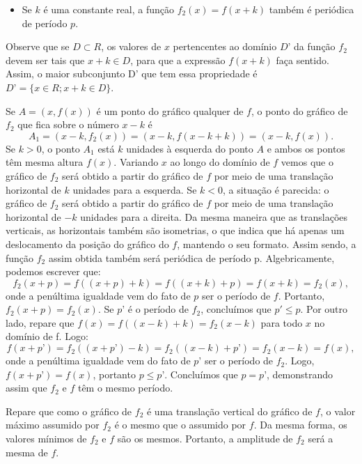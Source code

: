 \begin{itemize}
\item 	Se $k$ é uma constante real, a função $f_2(x) = f(x + k)$ também é periódica de período $p$.
\end{itemize}
Observe que se $D\subset R$, os valores de $x$ pertencentes ao domínio $D’$ da função $f_2$ devem ser tais que $x + k \in D$, para que a expressão $f(x+k)$ faça sentido. Assim, o maior subconjunto D’ que tem essa propriedade é $D’ = \{x \in R;x+k\in D\}$.

Se $A = (x,f(x))$ é um ponto do gráfico qualquer de $f$, o ponto do gráfico de $f_2$ que fica sobre o número $x - k$  é 
\begin{equation*}
A_1 = (x - k , f_2(x)) = (x - k, f(x - k + k)) = (x - k, f(x)).
\end{equation*}
Se $k > 0$, o ponto $A_1$ está $k$ unidades à esquerda do ponto $A$ e ambos os pontos têm mesma altura $f(x)$. Variando $x$ ao longo do domínio de $f$ vemos que o gráfico de $f_2$ será obtido a partir do gráfico de $f$ por meio de uma translação horizontal de $k$ unidades para a esquerda. Se $k < 0$, a situação é parecida: o gráfico de $f_2$ será obtido a partir do gráfico de $f$ por meio de uma translação horizontal de $-k$ unidades para a direita. Da mesma maneira que as translações verticais, as horizontais também são isometrias, o que indica que há apenas um deslocamento da posição do gráfico do $f$, mantendo o seu formato. Assim sendo, a função $f_2$ assim obtida também será periódica de período p. Algebricamente, podemos escrever que:
\begin{equation*}
f_2(x+p) = f((x+p) + k) = f((x+k)+p) = f(x+k) = f_2(x),
\end{equation*}
onde a penúltima igualdade vem do fato de $p$ ser o período de $f$. Portanto, $f_2(x+p) = f_2(x)$. Se $p’$ é o período de $f_2$, concluímos que $p'\leq p$. Por outro lado, repare que $f(x) = f((x - k ) + k) = f_2(x - k)$ para todo $x$ no domínio de f. Logo:
\begin{equation*}
f(x +p’) = f_2((x+p’) - k) = f_2((x - k) + p’) = f_2(x - k) = f(x),
\end{equation*}
onde a penúltima igualdade vem do fato de $p’$ ser o período de $f_2$. Logo, $f(x+p’) = f(x)$, portanto $p\leq p’$. Concluímos que $p = p’$, demonstrando assim que $f_2$ e $f$ têm o mesmo período.

Repare que como o gráfico de $f_2$ é uma translação vertical do gráfico de $f$, o valor máximo assumido por $f_2$ é o mesmo que o assumido por $f$. Da mesma forma, os valores mínimos de $f_2$ e $f$ são os mesmos. Portanto, a amplitude de $f_2$ será a mesma de $f$.

